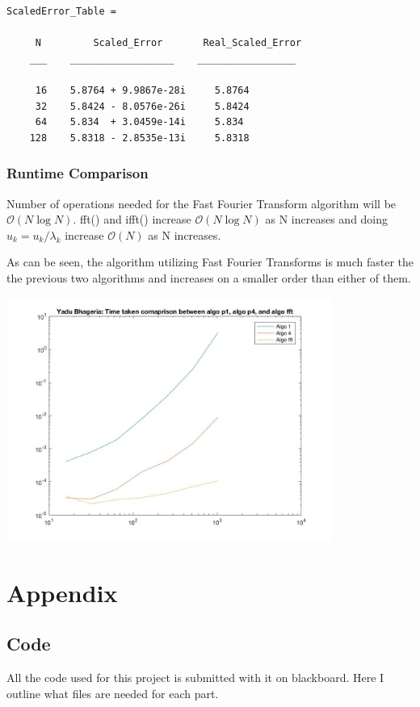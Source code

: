\documentclass{article}
\begin{document}
\begin{verbatim}
ScaledError_Table = 

     N         Scaled_Error       Real_Scaled_Error
    ___    __________________    _________________

     16    5.8764 + 9.9867e-28i     5.8764           
     32    5.8424 - 8.0576e-26i     5.8424           
     64    5.834  + 3.0459e-14i     5.834           
    128    5.8318 - 2.8535e-13i     5.8318    
\end{verbatim}

\subsubsection{Runtime Comparison}

Number of operations needed for the Fast Fourier Transform algorithm will be $\mathcal{O}(N\log N)$. fft() and ifft() increase $\mathcal{O}(N\log N)$ as N increases and doing $u_k = u_k / \lambda_k$ increase $\mathcal{O}(N)$ as N increases.

As can be seen, the algorithm utilizing Fast Fourier Transforms is much faster the the previous two algorithms and increases on a smaller order than either of them.

\includegraphics[width = 0.8\textwidth]{fig_timetaken_all.jpg}

\newpage
\section{Appendix}

\subsection{Code}
All the code used for this project is submitted with it on blackboard. Here I outline what files are needed for each part. 
\end{document}
